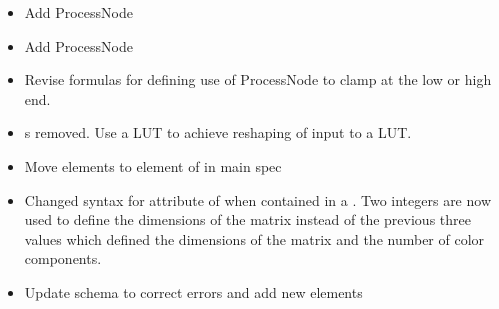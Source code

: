 \label{appendix-changes}

\vspace{20pt}
\begin{itemize}
    \item Add  ProcessNode
    \item Add  ProcessNode
    \item Revise formulas for defining use of  ProcessNode to clamp at the low or high end.
    \item {}s removed. Use a  LUT to achieve reshaping of input to a LUT.
    \item Move  elements to  element of  in main spec
    \item Changed syntax for  attribute of  when contained in a . Two integers are now used to define the dimensions of the matrix instead of the previous three values which defined the dimensions of the matrix and the number of color components.
    \item Update schema to correct errors and add new elements
\end{itemize}